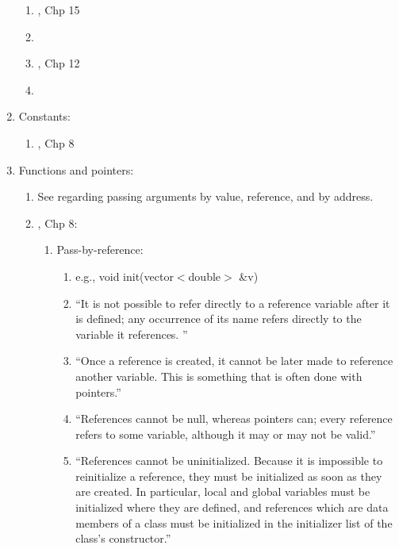 \begin{enumerate}
\begin{enumerate}
	\item \cite{Schildt2003}, Chp 15
	\item \cite[Chp. 13, pp. 299--330]{Schildt2003a}
	\item \cite{Eckel2000}, Chp 12
	\item \cite[Chp. 15, pp. 385--418]{Schildt1998a}
	\end{enumerate}
\item Constants: \vspace{-0.3cm}
	\begin{enumerate} \itemsep -2pt
	\item \cite{Eckel2000}, Chp 8
	\end{enumerate}
\item Functions and pointers: \vspace{-0.3cm}
	\begin{enumerate} \itemsep -2pt
	\item See \cite[\S7.2-7.4]{Pomeranz2014} regarding passing arguments by value, reference, and by address.
	\item \cite{Stroustrup2014}, Chp 8: \vspace{-0.2cm}
		\begin{enumerate} \itemsep -2pt
		\item Pass-by-reference: \vspace{-0.1cm}
			\begin{enumerate} \itemsep -1pt
			\item e.g., void init(vector$<$double$>$ \&v)
			\item ``It is not possible to refer directly to a reference variable after it is defined; any occurrence of its name refers directly to the variable it references. ''
			\item ``Once a reference is created, it cannot be later made to reference another variable. This is something that is often done with pointers.''
			\item ``References cannot be null, whereas pointers can; every reference refers to some variable, although it may or may not be valid.''
			\item ``References cannot be uninitialized. Because it is impossible to reinitialize a reference, they must be initialized as soon as they are created. In particular, local and global variables must be initialized where they are defined, and references which are data members of a class must be initialized in the initializer list of the class's constructor.''

\end{enumerate}
\end{enumerate}
\end{enumerate}
\end{enumerate}
